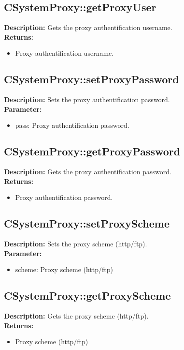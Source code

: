 \subsection{CSystemProxy::getProxyUser}
\textbf{Description:} Gets the proxy authentification username.\\
\textbf{Returns:}
\begin{itemize}
\item Proxy authentification username.
\end{itemize}

\subsection{CSystemProxy::setProxyPassword}
\textbf{Description:} Sets the proxy authentification password.\\
\textbf{Parameter:}
\begin{itemize}
\item pass: Proxy authentification password.
\end{itemize}

\subsection{CSystemProxy::getProxyPassword}
\textbf{Description:} Gets the proxy authentification password.\\
\textbf{Returns:}
\begin{itemize}
\item Proxy authentification password.
\end{itemize}

\subsection{CSystemProxy::setProxyScheme}
\textbf{Description:} Sets the proxy scheme (http/ftp).\\
\textbf{Parameter:}
\begin{itemize}
\item scheme: Proxy scheme (http/ftp)
\end{itemize}

\subsection{CSystemProxy::getProxyScheme}
\textbf{Description:} Gets the proxy scheme (http/ftp).\\
\textbf{Returns:}
\begin{itemize}
\item Proxy scheme (http/ftp)
\end{itemize}

